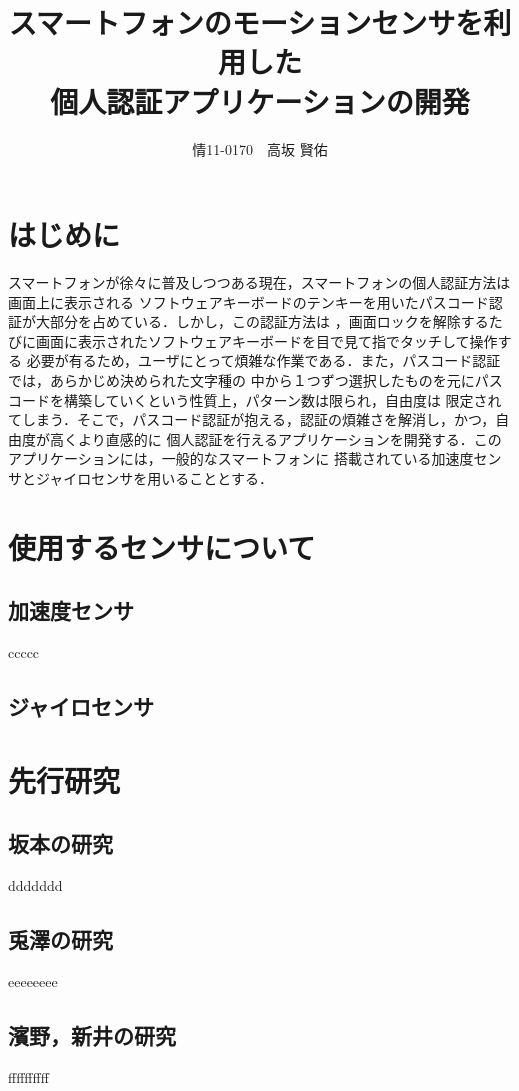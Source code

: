 \documentclass[11pt]{jreport}
\title{\bfseries スマートフォンのモーションセンサを利用した\\個人認証アプリケーションの開発}
\author{情11-0170　高坂 賢佑}
\date{}
\begin{document}
\maketitle

\tableofcontents
\listoffigures

\chapter*{はじめに}
スマートフォンが徐々に普及しつつある現在，スマートフォンの個人認証方法は画面上に表示される
ソフトウェアキーボードのテンキーを用いたパスコード認証が大部分を占めている．しかし，この認証方法は
，画面ロックを解除するたびに画面に表示されたソフトウェアキーボードを目で見て指でタッチして操作する
必要が有るため，ユーザにとって煩雑な作業である．また，パスコード認証では，あらかじめ決められた文字種の
中から１つずつ選択したものを元にパスコードを構築していくという性質上，パターン数は限られ，自由度は
限定されてしまう．そこで，パスコード認証が抱える，認証の煩雑さを解消し，かつ，自由度が高くより直感的に
個人認証を行えるアプリケーションを開発する．このアプリケーションには，一般的なスマートフォンに
搭載されている加速度センサとジャイロセンサを用いることとする．

\chapter{使用するセンサについて}
	\section{加速度センサ}
	ccccc
	
	\section{ジャイロセンサ}

\chapter{先行研究}
	\section{坂本の研究}
	ddddddd
	\section{兎澤の研究}
	eeeeeeee
	\section{濱野，新井の研究}
	ffffffffff
\end{document}
